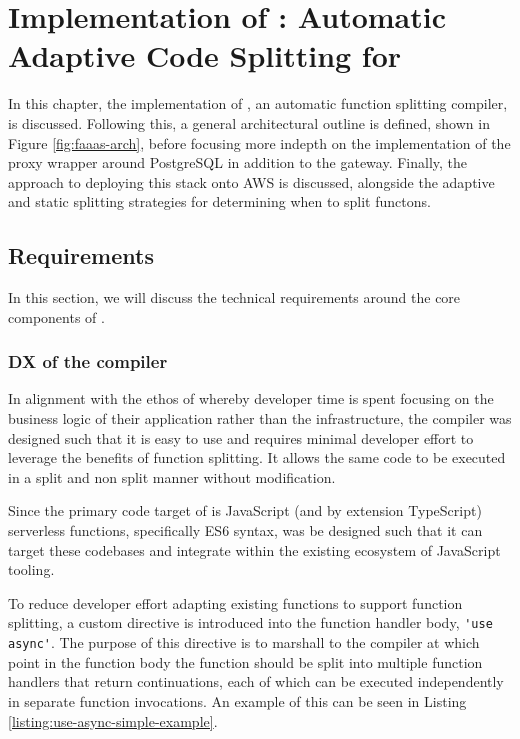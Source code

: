 \chapter{Implementation of \faaas{}: Automatic Adaptive Code Splitting for \faaslong{}}
\label{chap:impl}
In this chapter, the implementation of \faaasc{}, an automatic function splitting compiler, is discussed. Following this, a general architectural outline is defined, shown in Figure \ref{fig:faaas-arch}, before focusing more indepth on the implementation of the proxy wrapper around PostgreSQL in addition to the gateway. Finally, the approach to deploying this stack onto AWS is discussed, alongside the adaptive and static splitting strategies for determining when to split functons.

\section{Requirements}
In this section, we will discuss the technical requirements around the core components of \faaas{}.

\cprotect\subsection{DX of the \faaasc{} compiler}
In alignment with the ethos of \faas{} whereby developer time is spent focusing on the business logic of their application rather than the infrastructure, the \faaasc{} compiler was designed such that it is easy to use and requires minimal developer effort to leverage the benefits of function splitting. It allows the same code to be executed in a split and non split manner without modification.

Since the primary code target of \faaasc{} is JavaScript (and by extension TypeScript) serverless functions, specifically ES6 syntax, \faaasc{} was be designed such that it can target these codebases and integrate within the existing ecosystem of JavaScript tooling.

To reduce developer effort adapting existing functions to support function splitting, a custom directive is introduced into the function handler body, \verb|'use async'|. The purpose of this directive is to marshall to the \faaasc{} compiler at which point in the function body the function should be split into multiple function handlers that return continuations, each of which can be executed independently in separate \awslambda{} function invocations. An example of this can be seen in Listing \ref{listing:use-async-simple-example}.

